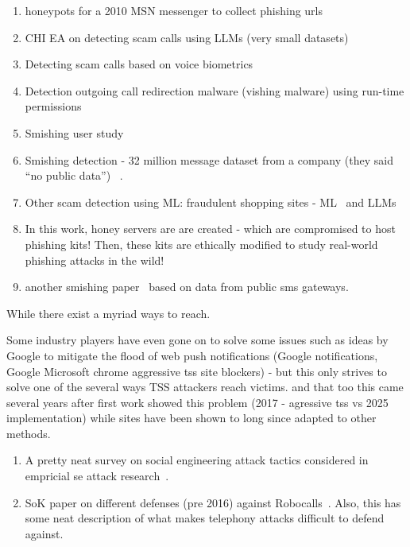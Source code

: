 \begin{enumerate}
\item honeypots for a 2010 MSN messenger to collect phishing urls~\cite{PolakisPMA10}
\item CHI EA on detecting scam calls using LLMs (very small datasets) ~\cite{ShenYZLNF25}
\item Detecting scam calls based on voice biometrics ~\cite{BalasubramaniyanPAHT10}
\item Detection outgoing call redirection malware (vishing malware) using run-time permissions ~\cite{KimKWKS22,LeeKK25}
\item Smishing user study ~\cite{RahmanTWN23}
\item Smishing detection - 32 million message dataset from a company (they said ``no public data'') ~\cite{Liu0LLDS21}. 
\item Other scam detection using ML: fraudulent shopping sites - ML~\cite{BitaabCOLWAWBSD23,BitaabKLOK0A0BS25} and LLMs ~\cite{BitaabKLMO0BSD25}
\item \cite{HanKB16} In this work, honey servers are are created - which are compromised to host phishing kits! Then, these kits are ethically modified to study real-world phishing attacks in the wild!
\item another smishing paper~\cite{NahapetyanPCOLKR24} based on data from public sms gateways.

\end{enumerate}


While there exist a myriad ways to reach. 

Some industry players have even gone on to solve some issues such as ideas by Google to mitigate the flood of web push notifications 
(Google notifications, Google Microsoft chrome aggressive tss site blockers) - but this only strives to solve one of the several ways TSS attackers reach victims. and that too this came several years after first work showed this problem (2017 - agressive tss vs 2025 implementation) while sites have been shown to long since adapted to other methods. 


 
\begin{enumerate}
    \item A pretty neat survey on social engineering attack tactics considered in empricial se attack research~\cite{BurdaAZ24}.
    \item SoK paper on different defenses (pre 2016) against Robocalls~\cite{TuDZA16}. Also, this has some neat description of what makes telephony attacks difficult to defend against.
\end{enumerate}